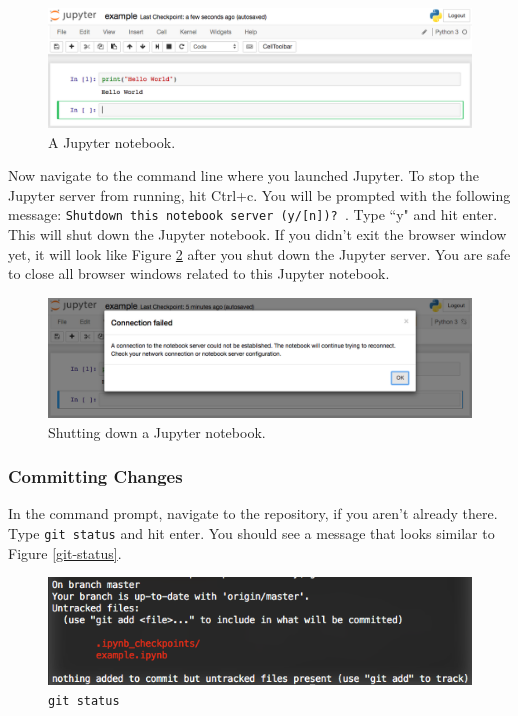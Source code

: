 \documentclass[11pt,a4paper]{article}
\begin{document}
\begin{figure}[h]
\centering
\includegraphics[width=.7\textwidth]{figures/example_notebook.png}
\caption{A Jupyter notebook.}
\label{fig:example-notebook}
\end{figure}

Now navigate to the command line where you launched Jupyter.
To stop the Jupyter server from running, hit Ctrl+c.
You will be prompted with the following message: \texttt{Shutdown this notebook server (y/[n])? }.
Type ``y" and hit enter.
This will shut down the Jupyter notebook.
If you didn't exit the browser window yet, it will look like Figure \ref{fig:jupyter-shutdown} after you shut down the Jupyter server.
You are safe to close all browser windows related to this Jupyter notebook.

\begin{figure}[h]
\centering
\includegraphics[width=.7\textwidth]{figures/jupyter_shutdown.png}
\caption{Shutting down a Jupyter notebook.}
\label{fig:jupyter-shutdown}
\end{figure}

\subsubsection*{Committing Changes}
In the command prompt, navigate to the repository, if you aren't already there.
Type \texttt{git status} and hit enter.
You should see a message that looks similar to Figure \ref{git-status}.

\begin{figure}[h]
\centering
\includegraphics[width=.7\textwidth]{figures/git_status.png}
\caption{\texttt{git status}}
\label{fig:git-status}
\end{figure}
\end{document}
